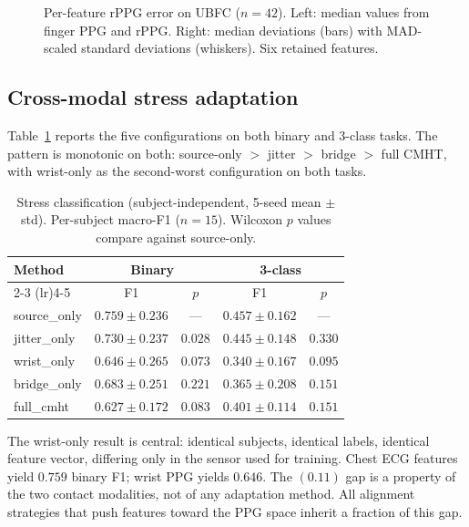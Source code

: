 \documentclass[conference]{IEEEtran}
\begin{document}
\begin{figure}[t]
\centering
\caption{Per-feature rPPG error on UBFC ($n{=}42$). Left: median
values from finger PPG and rPPG. Right: median deviations (bars) with
MAD-scaled standard deviations (whiskers). Six retained features.}
\label{fig:modality-gap}
\end{figure}

\subsection{Cross-modal stress adaptation}
Table~\ref{tab:stress} reports the five configurations on both binary
and 3-class tasks. The pattern is monotonic on both:
source-only $>$ jitter $>$ bridge $>$ full CMHT, with wrist-only as
the second-worst configuration on both tasks.

\begin{table}[t]
\caption{Stress classification (subject-independent, 5-seed
mean $\pm$ std). Per-subject macro-F1 ($n{=}15$). Wilcoxon $p$
values compare against source-only.}
\label{tab:stress}
\centering
\small
\begin{tabular}{lcccc}
\toprule
\multirow{2}{*}{Method} & \multicolumn{2}{c}{Binary} &
\multicolumn{2}{c}{3-class} \\
\cmidrule(lr){2-3} \cmidrule(lr){4-5}
 & F1 & $p$ & F1 & $p$ \\
\midrule
source\_only   & $\mathbf{0.759 \pm 0.236}$ & ---    & $\mathbf{0.457 \pm 0.162}$ & --- \\
jitter\_only   & $0.730 \pm 0.237$         & $0.028$ & $0.445 \pm 0.148$ & $0.330$ \\
wrist\_only    & $0.646 \pm 0.265$         & $0.073$ & $0.340 \pm 0.167$ & $0.095$ \\
bridge\_only   & $0.683 \pm 0.251$         & $0.221$ & $0.365 \pm 0.208$ & $0.151$ \\
full\_cmht     & $0.627 \pm 0.172$         & $0.083$ & $0.401 \pm 0.114$ & $0.151$ \\
\bottomrule
\end{tabular}
\end{table}

The wrist-only result is central: identical subjects, identical labels,
identical feature vector, differing only in the sensor used for
training. Chest ECG features yield $0.759$ binary F1; wrist PPG yields
$0.646$. The $(0.11)$ gap is a property of the two contact modalities,
not of any adaptation method. All alignment strategies that push
features toward the PPG space inherit a fraction of this gap.
\end{document}
